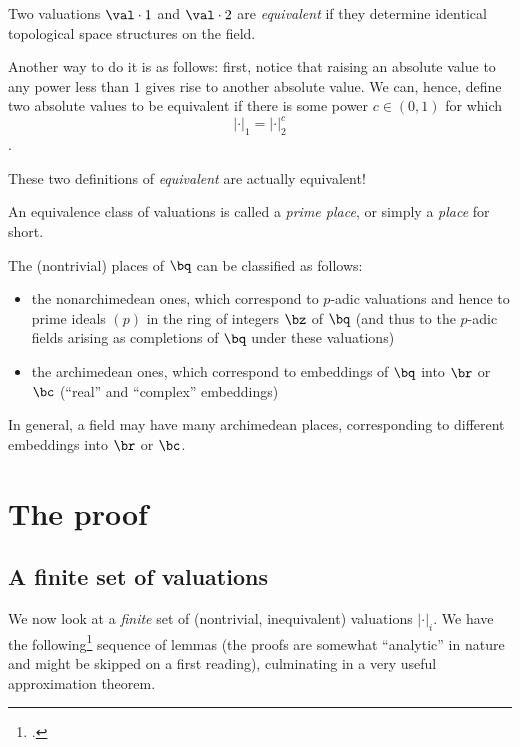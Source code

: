 \begin{defn}
  Two valuations $\val \cdot 1$ and $\val\cdot2$ are \textit{equivalent} if
  they determine identical topological space structures on the field.
\end{defn}

Another way to do it is as follows: first, notice that raising an absolute value
to any power less than $1$ gives rise to another absolute value. We can, hence,
define two absolute values to be equivalent if there is some power $c\in(0,1)$
for which \[|\cdot|_1 = |\cdot|_2^c\].

These two definitions of \textit{equivalent} are actually equivalent!

\begin{defn}
  An equivalence class of valuations is called a \textit{prime place}, or simply
  a \textit{place} for short.
\end{defn}

The (nontrivial) places of $\bq$ can be classified as follows:

\begin{itemize}
\item the nonarchimedean ones, which correspond to $p$-adic valuations and hence
  to prime ideals $(p)$ in the ring of integers $\bz$ of $\bq$ (and thus to the
  $p$-adic fields arising as completions of $\bq$ under these valuations)
\item the archimedean ones, which correspond to embeddings of $\bq$ into $\br$
  or $\bc$ (``real'' and ``complex'' embeddings)
\end{itemize}

In general, a field may have many archimedean places, corresponding to different
embeddings into $\br$ or $\bc$.

\section{The proof}
\subsection{A finite set of valuations}
\label{sec:orgheadline3}

We now look at a \textit{finite} set of (nontrivial, inequivalent) valuations
$|\cdot|_i$. We have the following\footcite[p. 471--2]{artinwhaples} sequence of
lemmas (the proofs are somewhat ``analytic'' in nature and might be skipped on a
first reading), culminating in a very useful approximation theorem.

